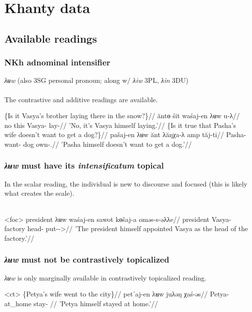 \documentclass{beamer}
\begin{document}
\section{Khanty data}
\subsection{Available readings}

\begin{frame}
    \frametitle{NKh adnominal intensifier}

    \textit{λʉw} (also 3SG personal pronoun; along w/ \textit{λiw} 3PL, \textit{λin} 3DU)\\~\\

    The contrastive and additive readings are available.
    
     \begingl
        \glpreamble \{Is it Vasya's brother laying there in the snow?\}//
        \gla ăntɵ śit waśaj-en λʉw u-λ//
        \glb no this Vasya-\Pssg{} \Int{} lay-\Npst{}//
        \glft 'No, it's Vasya himself laying.'//
    \endgl    
    \xe
     \begingl
        \glpreamble \{Is it true that Pasha's wife doesn't want to get a dog?\}//
        \gla pašaj-en λʉw ănt λăŋχa-λ amp tăj-ti//
        \glb Pasha-\Pssg{} \Int{} \Neg{} want-\Npst{} dog own-\Nfin.\Npst{}//
        \glft 'Pasha himself doesn't want to get a dog.'//
    \endgl    
    \xe
    
\end{frame}    


\begin{frame}
    \frametitle{\textit{λʉw} must have its \textit{intensificatum} topical}
    
    In the scalar reading, the individual is new to discourse and focused (this is likely what creates the scale).\\~\\
    
    
    \ex<foc>\begingl
    \gla\ljudge{*}president λʉw waśaj-en sawot kɵšaj-a oməs-s-əλλe//
    \glb president \Int{} Vasya-\Pssg{} factory head-\Dat{} put-\Pst{}-\Tsg{}>\Sg{}//
    \glft 'The president himself appointed Vasya as the head of the factory.'//
    \endgl
    \xe
    
\end{frame}

\begin{frame}
    \frametitle{\textit{λʉw} must not be contrastively topicalized}
    
    \textit{λʉw} is only marginally available in contrastively topicalized reading.
    
    \ex<ct>
    \begingl
    \glpreamble \{Petya's wife went to the city\}//
    \gla \ljudge{*}petˊaj-en λʉw juλəŋ χaś-əs//
    \glb Petya-\Pssg{} \Int{} at\_home stay-\Pst{} //
    \glft 'Petya himself stayed at home.'//
    \endgl
    \xe
    
\end{frame}
\end{document}
